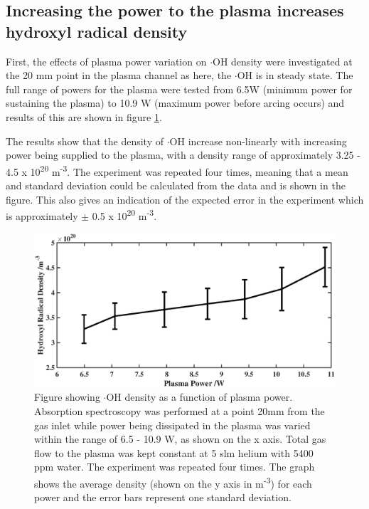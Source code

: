 \documentclass[11pt, oneside]{article}   	%
\begin{document}
\subsection{Increasing the power to the plasma increases hydroxyl radical density}

First, the effects of plasma power variation on $\cdot$OH density were investigated at the 20 mm point in the plasma channel as here, the $\cdot$OH is in steady state.
The full range of powers for the plasma were tested from 6.5W (minimum power for sustaining the plasma) to 10.9 W (maximum power before arcing occurs) and results of this are shown in figure \ref{fig:PowerVariation}.

The results show that the density of $\cdot$OH increase non-linearly with increasing power being supplied to the plasma, with a density range of approximately 3.25 - 4.5 x 10\textsuperscript{20} m\textsuperscript{-3}.
The experiment was repeated four times, meaning that a mean and standard deviation could be calculated from the data and is shown in the figure. 
This also gives an indication of the expected error in the experiment which is approximately $\pm$ 0.5 x 10\textsuperscript{20} m\textsuperscript{-3}.

\begin{figure}
    \centering
    \includegraphics[width=\textwidth]{Figures/PowerVariationBig.eps}
    \caption{Figure showing $\cdot$OH density as a function of plasma power. Absorption spectroscopy was performed at a point 20mm from the gas inlet while power being dissipated in the plasma was varied within the range of 6.5 - 10.9 W, as shown on the x axis. Total gas flow to the plasma was kept constant at 5 slm helium with 5400 ppm water. The experiment was repeated four times. The graph shows the average density (shown on the y axis in m\textsuperscript{-3}) for each power and the error bars represent one standard deviation.}
    \label{fig:PowerVariation}
\end{figure}
\end{document}
